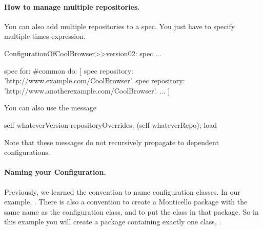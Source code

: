 \documentclass[a4paper,10pt,twoside]{book}
\begin{document}
\paragraph{How to manage multiple repositories.}
You can also add multiple repositories to a spec. You just have to specify multiple times  expression.

\begin{code}{}
ConfigurationOfCoolBrowser>>version02: spec
		...

		spec for: #common do: [
			spec repository: 'http://www.example.com/CoolBrowser'.
			spec repository: 'http://www.anotherexample.com/CoolBrowser'.
			...
			]
\end{code}

You can also use the message 

\begin{code}{}
self whateverVersion repositoryOverrides: (self whateverRepo); load
\end{code}

Note that these messages do not recursively propagate to dependent configurations.


\paragraph{Naming your Configuration.}

Previously, we learned the convention to name configuration classes. In our example, . There is also a convention to create a Monticello package with the same name as the configuration class, and to put the class in that package. So in this example you will create a package  containing exactly one class, .
\end{document}
